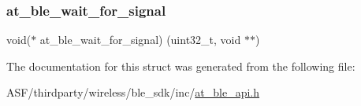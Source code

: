 \mbox{\label{structplatform__api__list__tag_ac7ce812bb94e7ff307732e068b569970}} 
\subsubsection{\texorpdfstring{at\_ble\_wait\_for\_signal}{at\_ble\_wait\_for\_signal}}
{\footnotesize\ttfamily void($\ast$ at\+\_\+ble\+\_\+wait\+\_\+for\+\_\+signal) (uint32\+\_\+t, void $\ast$$\ast$)}



The documentation for this struct was generated from the following file\+:\begin{DoxyCompactItemize}
\item 
A\+S\+F/thirdparty/wireless/ble\+\_\+sdk/inc/\mbox{\hyperlink{at__ble__api_8h}{at\+\_\+ble\+\_\+api.\+h}}\end{DoxyCompactItemize}
